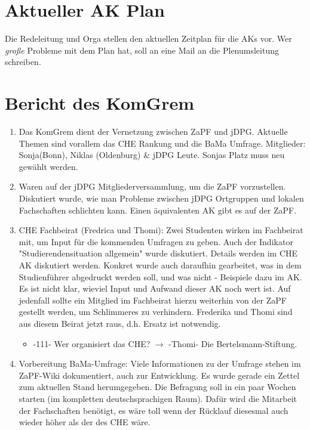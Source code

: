 \section{Aktueller AK Plan}
  Die Redeleitung und Orga stellen den aktuellen Zeitplan für die AKs vor. Wer \textit{große} Probleme mit dem Plan hat, soll an eine Mail an die Plenumsleitung schreiben.

\section{Bericht des KomGrem}
  \begin{enumerate}
    \item Das KomGrem dient der Vernetzung zwischen ZaPF und jDPG. Aktuelle Themen sind vorallem das CHE Rankung und die BaMa Umfrage. Mitglieder: Sonja(Bonn), Niklas (Oldenburg) \& jDPG Leute. Sonjas Platz muss neu gewählt werden.
    \item Waren auf der jDPG Mitgliederversammlung, um die ZaPF vorzustellen. Diskutiert wurde, wie man Probleme zwischen jDPG Ortgruppen und lokalen Fachschaften schlichten kann. Einen äquivalenten AK gibt es auf der ZaPF.
    \item CHE Fachbeirat (Fredrica und Thomi): Zwei Studenten wirken im Fachbeirat mit, um Input für die kommenden Umfragen zu geben. Auch der Indikator "Studierendensituation allgemein" wurde diskutiert. Details werden im CHE AK diskutiert werden.
      Konkret wurde auch daraufhin gearbeitet, was in dem Studienführer abgedruckt werden soll, und was nicht - Beispiele dazu im AK. Es ist nicht klar, wieviel Input und Aufwand dieser AK noch wert ist.
      Auf jedenfall sollte ein Mitglied im Fachbeirat hierzu weiterhin von der ZaPF gestellt werden, um Schlimmeres zu verhindern.
      Frederika und Thomi sind aus diesem Beirat jetzt raus, d.h. Ersatz ist notwendig.
      \begin{itemize}
        \item -111- Wer organisiert das CHE? $\rightarrow$ -Thomi- Die Bertelsmann-Stiftung.
      \end{itemize}
    \item Vorbereitung BaMa-Umfrage: Viele Informationen zu der Umfrage stehen im ZaPF-Wiki dokumentiert, auch zur Entwicklung. Es wurde gerade ein Zettel zum aktuellen Stand herumgegeben. Die Befragung soll in ein paar Wochen starten (im kompletten deutschsprachigen Raum).
      Dafür wird die Mitarbeit der Fachschaften benötigt, es wäre toll wenn der Rücklauf diesesmal auch wieder höher als der des CHE wäre.

\end{enumerate}
